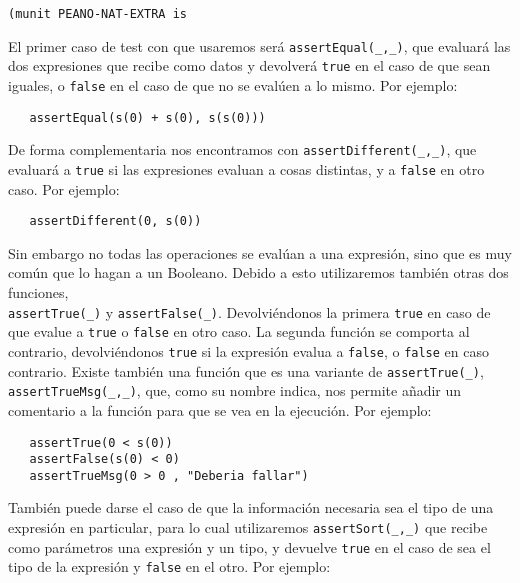 {\codesize
\begin{verbatim}
(munit PEANO-NAT-EXTRA is
\end{verbatim}
}

El primer caso de test con que usaremos será \verb"assertEqual(_,_)", que evaluará las dos expresiones que recibe como datos y devolverá \texttt{true} en el caso de que sean iguales, o \texttt{false} en el caso de que no se evalúen a lo mismo. Por ejemplo: \par

{\codesize
\begin{verbatim}
   assertEqual(s(0) + s(0), s(s(0)))
\end{verbatim}
}

De forma complementaria nos encontramos con \verb"assertDifferent(_,_)", que evaluará a \texttt{true} si las expresiones evaluan a cosas distintas, y a \texttt{false} en otro caso. Por ejemplo: \par

{\codesize
\begin{verbatim}
   assertDifferent(0, s(0))
\end{verbatim}
}

Sin embargo no todas las operaciones se evalúan a una expresión, sino que es muy común que lo hagan a un Booleano. Debido a esto utilizaremos también otras dos funciones,\\ \verb"assertTrue(_)" y \verb"assertFalse(_)". Devolviéndonos la primera \texttt{true} en caso de que evalue a \texttt{true} o \texttt{false} en otro caso. La segunda función se comporta al contrario, devolviéndonos \texttt{true} si la expresión evalua a \texttt{false}, o \texttt{false} en caso contrario. Existe también una función que es una variante de \verb"assertTrue(_)", \verb"assertTrueMsg(_,_)", que, como su nombre indica, nos permite añadir un comentario a la función para que se vea en la ejecución. Por ejemplo: \par

{\codesize
\begin{verbatim}
   assertTrue(0 < s(0))
   assertFalse(s(0) < 0)
   assertTrueMsg(0 > 0 , "Deberia fallar")
\end{verbatim}
}

También puede darse el caso de que la información necesaria sea el tipo de una expresión en particular, para lo cual utilizaremos \verb"assertSort(_,_)" que recibe como parámetros una expresión y un tipo, y devuelve \texttt{true} en el caso de sea el tipo de la expresión y \texttt{false} en el otro. Por ejemplo: \par

